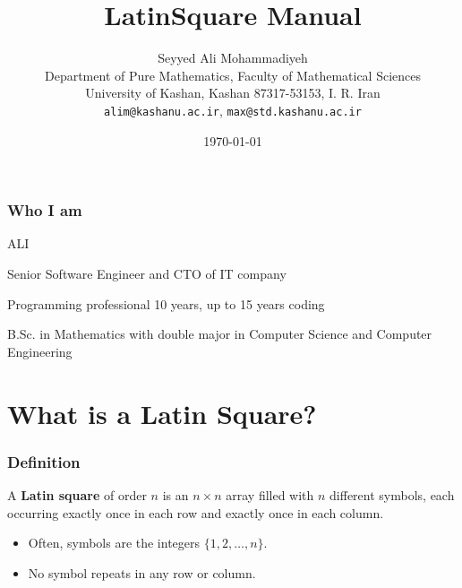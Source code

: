 \documentclass{beamer}
\title{LatinSquare Manual}
\author[S. A. Mohammadiyeh]{Seyyed Ali Mohammadiyeh\\
Department of Pure Mathematics, Faculty of Mathematical Sciences\\
University of Kashan, Kashan 87317-53153, I. R. Iran\\
\texttt{alim@kashanu.ac.ir}, \texttt{max@std.kashanu.ac.ir}}
\date{\today}
\begin{document}
\begin{frame}
  \titlepage
\end{frame}

\begin{frame}
  \frametitle{Who I am}
  ALI
  \begin{listings}
	\item Senior Software Engineer and CTO of IT company
	\item Programming professional 10 years, up to 15 years coding
	\item B.Sc. in Mathematics with double major in Computer Science and Computer Engineering
  \end{listings}
\end{frame}


\section{What is a Latin Square?}

\begin{frame}
\frametitle{Definition}
A \textbf{Latin square} of order $n$ is an $n \times n$ array filled with $n$ different symbols, each occurring exactly once in each row and exactly once in each column.
\pause
\begin{itemize}
  \item Often, symbols are the integers $\{1, 2, \dots, n\}$.
  \item No symbol repeats in any row or column.
\end{itemize}
\end{frame}


\end{document}
